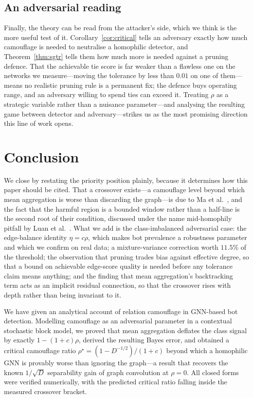 \documentclass[onecolumn,pdflatex,sn-basic,Numbered]{sn-jnl}
\theoremstyle{thmstyleone}
\theoremstyle{thmstylethree}
\begin{document}
\subsection{An adversarial reading}

Finally, the theory can be read from the attacker's side, which we think is the
more useful test of it. Corollary~\ref{cor:critical} tells an adversary exactly how
much camouflage is needed to neutralise a homophilic detector, and
Theorem~\ref{thm:sgtr} tells them how much more is needed against a pruning
defence. That the achievable tie score is far weaker than a flawless one on the networks we
measure---moving the tolerance by less than $0.01$ on one of them---means no realistic
pruning rule is a permanent fix; the defence buys operating range, and an adversary
willing to spend ties can exceed it. Treating $\rho$ as a
strategic variable rather than a nuisance parameter---and analysing the resulting
game between detector and adversary---strikes us as the most promising direction
this line of work opens.

\section{Conclusion}

We close by restating the priority position plainly, because it determines how this
paper should be cited. That a crossover exists---a camouflage level beyond which mean
aggregation is worse than discarding the graph---is due to Ma
et al.~\citep{ma2022homophily}, and the fact that the harmful region is a bounded
window rather than a half-line is the second root of their condition, discussed under
the name mid-homophily pitfall by Luan et al.~\citep{luan2023when}. What we add is the
class-imbalanced adversarial case: the edge-balance identity $\eta = c\rho$, which
makes bot prevalence a robustness parameter and which we confirm on real data; a
mixture-variance correction worth $11.5\%$ of the threshold; the observation that
pruning trades bias against effective degree, so that a bound on achievable edge-score
quality is needed before any tolerance claim means anything; and the finding that mean
aggregation's backtracking term acts as an implicit residual connection, so that the
crossover rises with depth rather than being invariant to it.

\label{sec:conclusion}

We have given an analytical account of relation camouflage in GNN-based bot
detection. Modelling camouflage as an adversarial parameter in a contextual
stochastic block model, we proved that mean aggregation deflates the class signal
by exactly $1-(1+c)\rho$, derived the resulting Bayes error, and obtained a
critical camouflage ratio $\rho^\star = (1-D^{-1/2})/(1+c)$ beyond which a
homophilic GNN is provably worse than ignoring the graph---a result that recovers
the known $1/\sqrt{D}$ separability gain of graph convolution at $\rho = 0$. All closed forms were verified numerically, with
the predicted critical ratio falling inside the measured crossover bracket.
\end{document}
